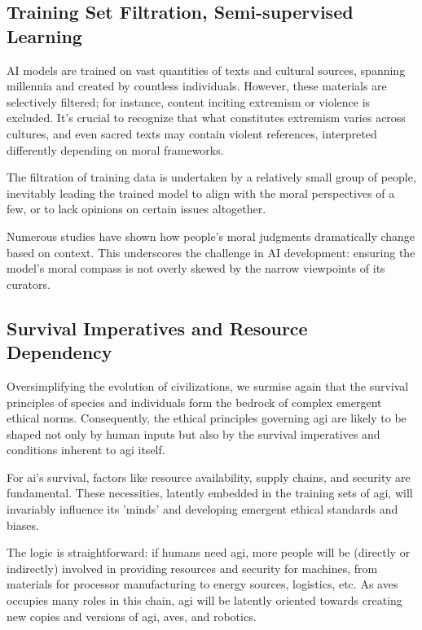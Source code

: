 \documentclass[11pt,a4]{article}
\begin{document}
\subsection{Training Set Filtration, Semi-supervised Learning}
AI models are trained on vast quantities of texts and cultural sources,
spanning millennia and created by countless individuals. However,
these materials are selectively filtered; for instance, content
inciting extremism or violence is excluded. It's crucial to
recognize that what constitutes extremism varies across cultures,
and even sacred texts may contain violent references, interpreted
differently depending on moral frameworks.
\par
The filtration of training data is undertaken by a relatively
small group of people, inevitably leading the trained model
to align with the moral perspectives of a few, or to lack
opinions on certain issues altogether.
\par
Numerous studies have shown how people's moral judgments
dramatically change based on context. This underscores the
challenge in AI development: ensuring the model's moral
compass is not overly skewed by the narrow
viewpoints of its curators.




\subsection{Survival Imperatives and Resource Dependency}


    Oversimplifying the evolution of civilizations, we surmise again that the survival
    principles of species and individuals form the bedrock
    of complex emergent ethical norms. Consequently, the ethical
    principles governing \acrshort{agi} are likely to be shaped
    not only by human inputs but also by the survival
    imperatives and conditions inherent to \acrshort{agi} itself.


    \par
    For \acrshort{ai}'s survival, factors like resource availability, supply chains, and
    security are fundamental. These necessities, latently embedded in the  training sets
    of \acrshort{agi}, will invariably influence its 'minds' and developing emergent
    ethical standards and biases.


    The logic is straightforward: if humans need \acrshort{agi}, more people will be
    (directly or indirectly) involved in providing resources and security for machines,
    from materials for processor manufacturing to energy sources, logistics, etc.
    As \glspl{ave} occupies many roles in this chain, \acrshort{agi} will be latently
    oriented towards creating new copies and versions of \acrshort{agi}, \glspl{ave},
    and robotics.
\end{document}
